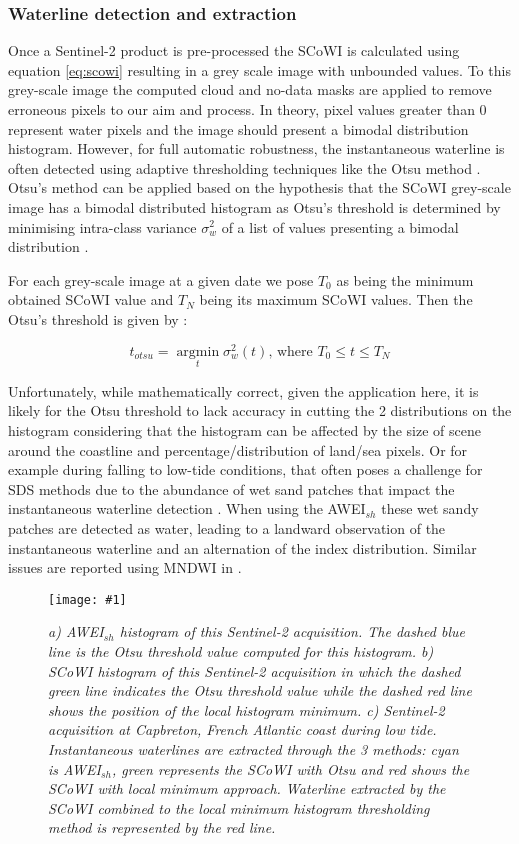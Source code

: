 \documentclass[remotesensing,technicalnote,submit,pdftex,moreauthors]{Definitions/mdpi}
\newcommand{\myfigure}[4]{
    \begin{figure*}[ht!]
        \centering
        \texttt{[image: \#1]}	 
        \caption{\itshape#2}
        \label{#3}
    \end{figure*} 
}
\begin{document}
\subsubsection{Waterline detection and extraction}
Once a Sentinel-2 product is pre-processed the SCoWI is calculated using equation \ref{eq:scowi} resulting in a grey scale image with unbounded values. To this grey-scale image the computed cloud and no-data masks are applied to remove erroneous pixels to our aim and process. In theory, pixel values greater than 0 represent water pixels and the image should present a bimodal distribution histogram. However, for full automatic robustness, the instantaneous waterline is often detected using adaptive thresholding techniques like the Otsu method \citep{Bishop_sub_pixel, VOS2019_sub}. Otsu's method can be applied based on the hypothesis that the SCoWI grey-scale image has a bimodal distributed histogram as Otsu's threshold is determined by minimising intra-class variance $\sigma_w^2$ of a list of values presenting a bimodal distribution \citep{OTSU1979}.

For each grey-scale image at a given date we pose $T_0$ as being the minimum obtained SCoWI value and $T_N$ being its maximum SCoWI values. Then the Otsu's threshold is given by :

\begin{equation}
    t_{otsu} = \operatorname*{argmin}_t \sigma_w^2(t) \text{, where }T_0 \le t \le T_N
    \label{eq:otsu}
\end{equation}

Unfortunately, while mathematically correct, given the application here, it is likely for the Otsu threshold to lack accuracy in cutting the 2 distributions on the histogram considering that the histogram can be affected by the size of scene around the coastline and percentage/distribution of land/sea pixels. Or for example during falling to low-tide conditions, that often poses a challenge for SDS methods due to the abundance of wet sand patches that impact the instantaneous waterline detection \citep{CASTELLE2021107707}. When using the AWEI$_{sh}$ these wet sandy patches are detected as water, leading to a landward observation of the instantaneous waterline and an alternation of the index distribution. Similar issues are reported using MNDWI in \citet{VOS2019_sub}. 

\myfigure{img/AWEIsh_vs_SCOWI_crop_new.png}{a) AWEI$_{sh}$ histogram of this Sentinel-2 acquisition. The dashed blue line is the Otsu threshold value computed for this histogram. b) SCoWI histogram of this Sentinel-2 acquisition in which the dashed green line indicates the Otsu threshold value while the dashed red line shows the position of the local histogram minimum. c) Sentinel-2 acquisition at Capbreton, French Atlantic coast during low tide. Instantaneous waterlines are extracted through the 3 methods: cyan is AWEI$_{sh}$, green represents the SCoWI with Otsu and red shows the SCoWI with local minimum approach. Waterline extracted by the SCoWI combined to the local minimum histogram thresholding method is represented by the red line. }{SCOWI_vs_AWEI_hist}{0.8}
\end{document}
